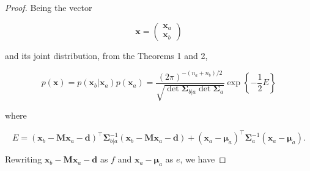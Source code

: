 \begin{appendices}
\begin{theorem}
  \end{theorem}

  \begin{proof}
    Being the vector

    \begin{equation}
      \mathbf{x} = \left( \begin{array}{c} \mathbf{x}_a \\ \mathbf{x}_b \end{array} \right)
    \end{equation}

    and its joint distribution, from the Theorems 1 and 2,

    \begin{equation}
      p(\mathbf{x}) = p(\mathbf{x}_b | \mathbf{x}_a)p(\mathbf{x}_a) = \frac{(2 \pi)^{-\left(n_{a}+n_{b}\right) / 2}}{\sqrt{\det \boldsymbol{\Sigma}_{b | a} \det \boldsymbol{\Sigma}_{a}}} \exp \left\{ -\frac{1}{2} E \right\}
    \end{equation}

    where 

    \begin{equation}
      E=\left(\mathbf{x}_{b}-\mathbf{M} \mathbf{x}_{a}-\mathbf{d}\right)^\top \boldsymbol{\Sigma}_{b | a}^{-1}\left(\mathbf{x}_{b}-\mathbf{M} \mathbf{x}_{a}-\mathbf{d}\right)+\left(\mathbf{x}_{a}-\boldsymbol{\mu}_{a}\right)^\top \boldsymbol{\Sigma}_{a}^{-1}\left(\mathbf{x}_{a}-\boldsymbol{\mu}_{a}\right).
    \end{equation}

    Rewriting $\mathbf{x}_{b}-\mathbf{M} \mathbf{x}_{a}-\mathbf{d}$ as $f$ and $\mathbf{x}_{a}-\boldsymbol{\mu}_{a}$ as $e$, we have


\end{proof}
\end{appendices}
